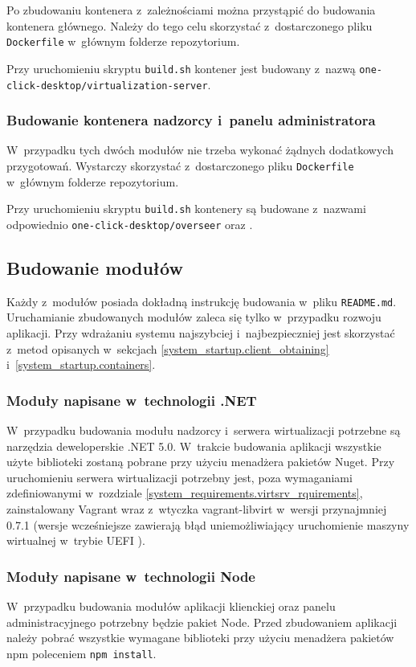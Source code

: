 \documentclass[../opis-rozwiazania.tex]{subfiles}
\begin{document}
Po zbudowaniu kontenera z~zależnościami można przystąpić do budowania kontenera głównego.
Należy do tego celu skorzystać z~dostarczonego pliku \texttt{Dockerfile} w~głównym folderze repozytorium.

Przy uruchomieniu skryptu \texttt{build.sh} kontener jest budowany z~nazwą \texttt{one-click-desktop/virtualization-server}.

\subsubsection{Budowanie kontenera nadzorcy i~panelu administratora}
W~przypadku tych dwóch modułów nie trzeba wykonać żądnych dodatkowych przygotowań.
Wystarczy skorzystać z~dostarczonego pliku \texttt{Dockerfile} w~głównym folderze repozytorium.

Przy uruchomieniu skryptu \texttt{build.sh} kontenery są budowane z~nazwami odpowiednio \texttt{one-click-desktop/overseer} oraz \texttt{}.

\subsection{Budowanie modułów}
Każdy z~modułów posiada dokładną instrukcję budowania w~pliku \texttt{README.md}.
Uruchamianie zbudowanych modułów zaleca się tylko w~przypadku rozwoju aplikacji.
Przy wdrażaniu systemu najszybciej i~najbezpieczniej jest skorzystać z~metod opisanych w~sekcjach \ref{system_startup.client_obtaining} i~\ref{system_startup.containers}.

\subsubsection{Moduły napisane w~technologii .NET}
W~przypadku budowania modułu nadzorcy i~serwera wirtualizacji potrzebne są narzędzia deweloperskie .NET 5.0.
W~trakcie budowania aplikacji wszystkie użyte biblioteki zostaną pobrane przy użyciu menadżera pakietów Nuget.
Przy uruchomieniu serwera wirtualizacji potrzebny jest, poza wymaganiami zdefiniowanymi w~rozdziale \ref{system_requirements.virtsrv_rquirements}, zainstalowany Vagrant wraz z~wtyczka vagrant-libvirt w~wersji przynajmniej 0.7.1 (wersje wcześniejsze zawierają błąd uniemożliwiający uruchomienie maszyny wirtualnej w~trybie UEFI \parencite{vagrant-libvirt-nvram-error}).

\subsubsection{Moduły napisane w~technologii Node}
W~przypadku budowania modułów aplikacji klienckiej oraz panelu administracyjnego potrzebny będzie pakiet Node. Przed zbudowaniem aplikacji należy pobrać wszystkie wymagane biblioteki przy użyciu menadżera pakietów npm poleceniem \texttt{npm install}.
\end{document}
